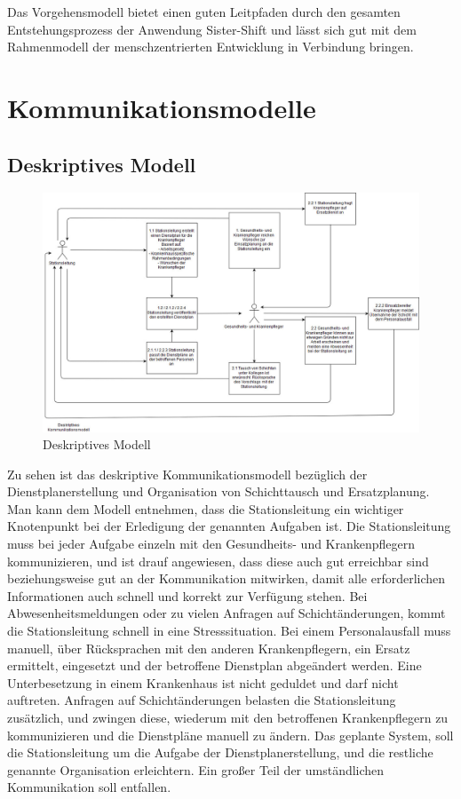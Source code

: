 \documentclass[10pt,a4paper]{article}
\begin{document}
Das Vorgehensmodell bietet einen guten Leitpfaden durch den gesamten Entstehungsprozess der Anwendung Sister-Shift und lässt sich gut mit dem Rahmenmodell der menschzentrierten Entwicklung in Verbindung bringen.
\section{Kommunikationsmodelle}
\subsection{Deskriptives Modell}
\begin{figure}[H]
\includegraphics[scale=0.3]{Bilder/KommunikationsmodellierungDeskriptiv.jpg}{\centering}
\caption{Deskriptives Modell}
\end{figure}
Zu sehen ist das deskriptive Kommunikationsmodell bezüglich der Dienstplanerstellung und Organisation von Schichttausch und Ersatzplanung. Man kann dem Modell entnehmen, dass die Stationsleitung ein wichtiger Knotenpunkt bei der Erledigung der genannten Aufgaben ist. Die Stationsleitung muss bei jeder Aufgabe einzeln mit den Gesundheits- und Krankenpflegern kommunizieren, und ist drauf angewiesen, dass diese auch gut erreichbar sind beziehungsweise gut an der Kommunikation mitwirken, damit alle erforderlichen Informationen auch schnell und korrekt zur Verfügung stehen. Bei Abwesenheitsmeldungen oder zu vielen Anfragen auf Schichtänderungen, kommt die Stationsleitung schnell in eine Stresssituation.  Bei einem Personalausfall muss manuell, über Rücksprachen mit den anderen Krankenpflegern, ein Ersatz ermittelt, eingesetzt und der betroffene Dienstplan abgeändert werden. Eine Unterbesetzung in einem Krankenhaus ist nicht geduldet und darf nicht auftreten. Anfragen auf Schichtänderungen belasten die Stationsleitung zusätzlich, und zwingen diese, wiederum mit den betroffenen Krankenpflegern zu kommunizieren und die Dienstpläne manuell zu ändern. 
Das geplante System, soll die Stationsleitung um die Aufgabe der Dienstplanerstellung, und die restliche genannte Organisation erleichtern. Ein großer Teil der umständlichen Kommunikation soll entfallen.
\end{document}
